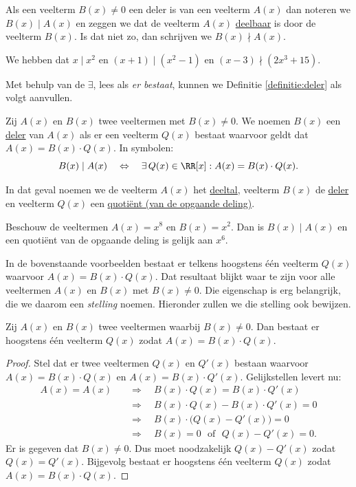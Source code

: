 \documentclass{ximera}
\begin{document}
Als een veelterm $B(x) \neq 0$ een deler is van een veelterm $A(x)$ dan noteren we $B(x) \mid A(x)$ en zeggen we dat de veelterm $A(x)$ \underline{deelbaar} is door de veelterm $B(x)$. Is dat niet zo, dan schrijven we $B(x) \nmid A(x)$. 

\begin{example} 
We hebben dat $x \mid x^2$ en $(x+1) \mid (x^2-1)$ en $(x-3) \nmid (2x^3+15)$.
\end{example}

Met behulp van de  $\exists$, lees als {\em er bestaat}, kunnen we Definitie \ref{definitie:deler} als volgt aanvullen.

\begin{definition}
Zij $A(x)$ en $B(x)$ twee veeltermen met $B(x) \neq 0$. We noemen $B(x)$ een \underline{deler} van $A(x)$ als er een veelterm $Q(x)$ bestaat waarvoor geldt dat $A(x) = B(x)\cdot Q(x)$. In symbolen:
\[
B(x) \mid A(x) \quad \Leftrightarrow \quad \exists \, Q(x) \in \RR[x]: A(x) = B(x)\cdot Q(x).
\]
\end{definition}

In dat geval noemen we de veelterm $A(x)$ het \underline{deeltal}, veelterm $B(x)$ de \underline{deler} en veelterm $Q(x)$ een \underline{quoti\"ent (van de opgaande deling)}. 

\begin{example}
Beschouw de veeltermen $A(x) = x^8$ en $B(x) = x^2$. Dan is $B(x) \mid A(x)$ en een quoti\"ent van de opgaande deling is gelijk aan $x^6$. 
\end{example}

In de bovenstaande voorbeelden bestaat er telkens hoogstens \'e\'en veelterm $Q(x)$ waarvoor $A(x) = B(x)\cdot Q(x)$. Dat resultaat blijkt waar te zijn voor alle veeltermen $A(x)$ en $B(x)$ met $B(x) \neq 0$. Die eigenschap is erg belangrijk, die we daarom een {\em stelling} noemen. Hieronder zullen we die stelling ook bewijzen. 

\begin{stelling}
Zij $A(x)$ en $B(x)$ twee veeltermen waarbij $B(x) \neq 0$. Dan bestaat er hoogstens \'e\'en veelterm $Q(x)$ zodat $A(x) = B(x)\cdot Q(x)$. 
\end{stelling}
\begin{proof}
Stel dat er twee veeltermen $Q(x)$ en $Q'(x)$ bestaan waarvoor $A(x) = B(x)\cdot Q(x)$ en $A(x) = B(x)\cdot Q'(x)$. Gelijkstellen levert nu:
\begin{align*}
A(x) = A(x) \quad & \Rightarrow \quad B(x)\cdot Q(x) = B(x)\cdot Q'(x) \\
& \Rightarrow \quad B(x)\cdot Q(x) - B(x)\cdot Q'(x) = 0 \\
& \Rightarrow \quad B(x) \cdot \bigl(Q(x) - Q'(x) \bigr) = 0 \\
& \Rightarrow \quad B(x) = 0 \,\,\text{ of } \,\, Q(x) - Q'(x) = 0. 
\end{align*}
Er is gegeven dat $B(x) \neq 0$. Dus moet noodzakelijk $Q(x) - Q'(x)$ zodat $Q(x) = Q'(x)$. Bijgevolg bestaat er hoogstens \'e\'en veelterm $Q(x)$ zodat $A(x) = B(x)\cdot Q(x)$.
\end{proof}
\end{document}
